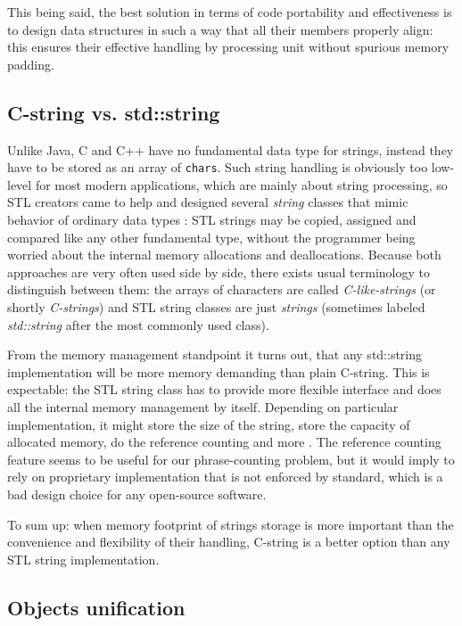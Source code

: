 This being said, the best solution in terms of code portability and effectiveness
is to design data structures in such a way that all their members properly align:
this ensures their effective handling by processing unit without spurious memory padding.

\subsection{C-string vs. std::string}

Unlike Java, C and C++ have no fundamental data type for strings, instead they have
to be stored as an array of \verb|chars|.
Such string handling is obviously too low-level for most modern applications,
which are mainly about string processing, so STL creators came to help and designed
several \emph{string} classes that mimic behavior of ordinary data types
\citep[Chapter 11]{josuttis:stl}:
STL strings may be copied, assigned and compared like any other fundamental type,
without the programmer being worried about the internal memory allocations and deallocations.
Because both approaches are very often used side by side, there exists usual terminology to
distinguish between them:
the arrays of characters are called \emph{C-like-strings} (or shortly \emph{C-strings}) and
STL string classes are just \emph{strings} (sometimes labeled \emph{std::string} after the
most commonly used class).

From the memory management standpoint it turns out, that any std::string
implementation will be more memory demanding than plain C-string.
This is expectable: the STL string class has to provide more flexible interface
and does all the internal memory management by itself.
Depending on particular implementation, it might store the size of the string,
store the capacity of allocated memory, do the reference counting and more
\citep[Item 15]{meyers:effectivestl}.
The reference counting feature seems to be useful for our phrase-counting problem,
but it would imply to rely on proprietary implementation that is not enforced by
standard, which is a bad design choice for any open-source software.

To sum up: when memory footprint of strings storage is more important than
the convenience and flexibility of their handling, C-string is a better option
than any STL string implementation.

\subsection{Objects unification}

